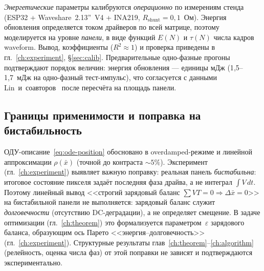 \emph{Энергетические} параметры калибруются \emph{операционно} по измерениям
стенда (ESP32 + Waveshare~2.13''~V4 + INA219, $R_{\mathrm{shunt}}=0{,}1$~Ом).
Энергия обновления определяется током драйверов по всей матрице, поэтому
моделируется на уровне \emph{панели}, в виде функций $E(N)$ и $\tau(N)$ числа
кадров waveform. Вывод, коэффициенты ($R^2\approx1$) и
проверка приведены в гл.~\ref{ch:experiment}, \S\ref{sec:calib}. Предварительные
одно-фазные прогоны подтверждают порядок величин: энергия обновления — единицы
мДж (1{,}5--1{,}7~мДж на одно-фазный тест-импульс), что согласуется с
данными Lin~и~соавторов~\cite{lin2024_low_power} после пересчёта на площадь
панели.

\subsection*{Границы применимости и поправка на бистабильность}

ОДУ-описание~\eqref{eq:ode-position} обосновано в overdamped-режиме и линейной
аппроксимации $\rho(\bar x)$ (точной до контраста $\sim5\%$). Эксперимент
(гл.~\ref{ch:experiment}) выявляет важную поправку: реальная панель
\emph{бистабильна}: итоговое состояние пикселя задаёт последняя фаза драйва, а
не интеграл $\int V\,dt$. Поэтому линейный вывод <<строгий зарядовый баланс
$\sum V T=0 \Rightarrow \Delta\bar x=0$>> на бистабильной панели не выполняется:
зарядовый баланс служит \emph{долговечности} (отсутствию DC-деградации), а не
определяет смещение. В задаче оптимизации (гл.~\ref{ch:theorem}) это
формализуется параметром~$\varepsilon$ зарядового баланса, образующим ось Парето
<<энергия--долговечность>> (гл.~\ref{ch:experiment}). Структурные результаты
глав~\ref{ch:theorem}--\ref{ch:algorithm} (релейность, оценка числа фаз) от этой
поправки не зависят и подтверждаются экспериментально.
